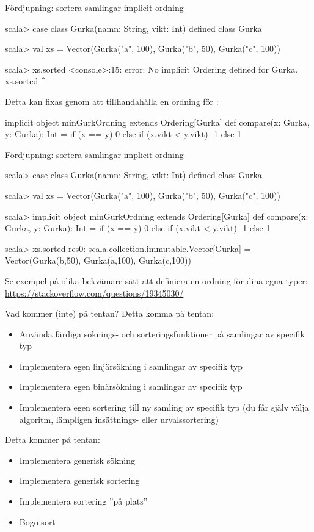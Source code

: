 \begin{Slide}{Fördjupning: sortera samlingar implicit ordning}
\begin{REPL}
scala> case class Gurka(namn: String, vikt: Int)
defined class Gurka

scala> val xs = Vector(Gurka("a", 100), Gurka("b", 50), Gurka("c", 100))

scala> xs.sorted
<console>:15: error: No implicit Ordering defined for Gurka.
       xs.sorted
          ^
\end{REPL}
\pause
Detta kan fixas genom att tillhandahålla en  ordning för :
\begin{Code}
implicit object minGurkOrdning extends Ordering[Gurka] {
  def compare(x: Gurka, y: Gurka): Int =
    if (x == y) 0
    else if (x.vikt < y.vikt) -1
    else 1
}
\end{Code}
\end{Slide}


\begin{Slide}{Fördjupning: sortera samlingar implicit ordning}
\begin{REPL}
scala> case class Gurka(namn: String, vikt: Int)
defined class Gurka

scala> val xs = Vector(Gurka("a", 100), Gurka("b", 50), Gurka("c", 100))

scala> implicit object minGurkOrdning extends Ordering[Gurka] {
         def compare(x: Gurka, y: Gurka): Int =
           if (x == y) 0
           else if (x.vikt < y.vikt) -1
           else 1
       }

scala> xs.sorted
res0: scala.collection.immutable.Vector[Gurka] =
        Vector(Gurka(b,50), Gurka(a,100), Gurka(c,100))
\end{REPL}
{\SlideFontTiny Se exempel på olika bekvämare sätt att definiera en ordning för dina egna typer: \\
\url{https://stackoverflow.com/questions/19345030/}}
\end{Slide}


\begin{Slide}{Vad kommer (inte) på tentan?}
Detta  komma på tentan:
\begin{itemize}
\item Använda färdiga söknings- och sorteringsfunktioner på samlingar av specifik typ
\item Implementera egen linjärsökning i samlingar av specifik typ
\item Implementera egen binärsökning i samlingar av specifik typ
\item Implementera egen sortering till ny samling av specifik typ (du får själv välja algoritm, lämpligen insättnings- eller urvalssortering)

\end{itemize}
Detta kommer  på tentan:
\begin{itemize}
\item Implementera generisk sökning
\item Implementera generisk sortering
\item Implementera sortering ''på plats''
\item Bogo sort
\end{itemize}
\end{Slide}

